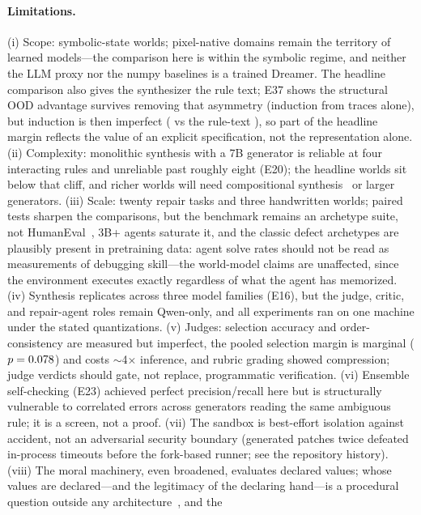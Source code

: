 \documentclass[11pt]{article}
\begin{document}
\paragraph{Limitations.} (i) Scope: symbolic-state worlds; pixel-native
domains remain the territory of learned models---the comparison here is
within the symbolic regime, and neither the LLM proxy nor the numpy
baselines is a trained Dreamer. The headline comparison also gives the
synthesizer the rule text; E37 shows the structural OOD advantage survives
removing that asymmetry (induction from traces alone), but induction is then
imperfect (\IndTracesIn{} vs the rule-text \IndRulesIn), so part of the
headline margin reflects the value of an explicit specification, not the
representation alone. (ii) Complexity: monolithic synthesis with a
7B generator is reliable at four interacting rules and unreliable past
roughly eight (E20); the headline worlds sit below that cliff, and richer
worlds will need compositional synthesis~\cite{poeworld2025} or larger
generators. (iii) Scale: twenty repair tasks and three handwritten worlds;
paired tests sharpen the comparisons, but the benchmark remains an archetype
suite, not HumanEval~\cite{humaneval2021}, 3B+ agents saturate it, and the
classic defect archetypes are plausibly present in pretraining data: agent
solve rates should not be read as measurements of debugging skill---the
world-model claims are unaffected, since the environment executes exactly
regardless of what the agent has memorized. (iv) Synthesis replicates across
three model families (E16), but the judge, critic, and repair-agent roles
remain Qwen-only, and all experiments ran on one machine under the stated
quantizations. (v) Judges: selection accuracy and order-consistency are
measured but imperfect, the pooled selection margin is marginal
($p=0.078$) and costs $\sim$4$\times$ inference, and rubric grading
showed compression; judge verdicts should gate, not replace, programmatic
verification. (vi) Ensemble self-checking (E23) achieved perfect
precision/recall here but is structurally vulnerable to correlated errors
across generators reading the same ambiguous rule; it is a screen, not a
proof. (vii) The sandbox is best-effort isolation against accident, not an
adversarial security boundary (generated patches twice defeated in-process
timeouts before the fork-based runner; see the repository history).
(viii) The moral machinery, even broadened, evaluates declared values; whose
values are declared---and the legitimacy of the declaring hand---is a
procedural question outside any architecture~\cite{scanlon1998}, and the
\end{document}
